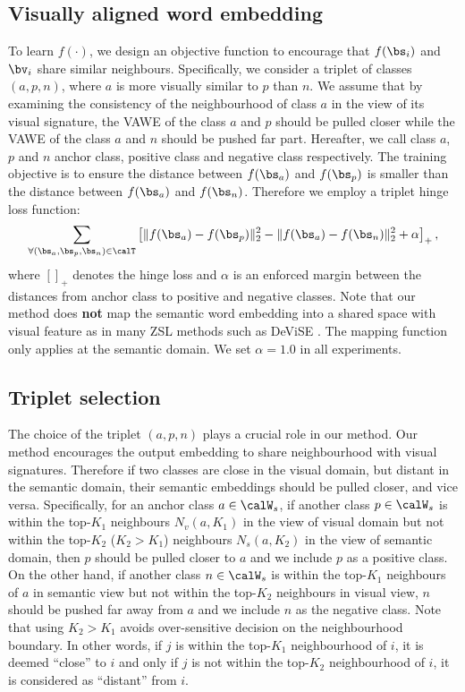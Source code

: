 \documentclass{bmvc2k}
\begin{document}
\subsection{Visually aligned word embedding}
\label{sec: structure}
To learn $f(\cdot)$, we design an objective function to encourage that $f(\bs_i)$ and $\bv_i$ share similar neighbours. Specifically, we consider a triplet of classes $(a, p, n)$, where $a$ is more visually similar to $p$ than $n$. We assume that by examining the consistency of the neighbourhood of class $a$ in the view of its visual signature, the VAWE of the class $a$ and $p$ should be pulled closer while the VAWE of the class $a$ and $n$ should be pushed far part. Hereafter, we call class $a$, $p$ and $n$ anchor class, positive class and negative class respectively. The training objective is to ensure the distance between $f(\bs_a)$ and $f(\bs_p)$ is smaller than the distance between $f(\bs_a)$ and $f(\bs_n)$. Therefore we employ a triplet hinge loss function:
\begin{align}\label{eq:LOSS}
 \sum_{\forall (\bs_a, \bs_p, \bs_n) \in \calT} \left[  \|f(\bs_a) - f(\bs_p) \|_2^2 - \|f(\bs_a) - f(\bs_n) \|_2^2  + \alpha \right]_+,
\end{align}where $[]_+$ denotes the hinge loss and $\alpha$ is an enforced margin between the distances from anchor class to positive and negative classes. Note that our method does {\bf not} map the semantic word embedding into a shared space with %
visual feature as in many ZSL methods such as DeViSE \cite{Frome2013NIPS_devise}. The mapping function only applies at the semantic domain. We set $\alpha=1.0$ in all experiments.

\subsection{Triplet selection}
\label{sec: triplet}
The choice of the triplet $(a, p, n)$ plays a crucial role in our method. Our method encourages the output embedding to share neighbourhood with visual signatures. Therefore if two classes are close in the visual domain, but distant in the semantic domain, their semantic embeddings should be pulled closer, and vice versa. Specifically, for an anchor class $a \in \calW_s$, if another class $p \in \calW_s$ is within the top-$K_1$ neighbours $N_v(a, K_1)$ in the view of visual domain but not within the top-$K_2$ ($K_2 > K_1$) neighbours $N_s(a, K_2)$ in the view of semantic domain, then $p$ should be pulled closer to $a$ and we include $p$ as a positive class. On the other hand, if another class $n \in \calW_s$ is within the top-$K_1$ neighbours of $a$ in semantic view but not within the top-$K_2$ neighbours in visual view, $n$ should be pushed far away from $a$ and we include $n$ as the negative class. Note that using $K_2 > K_1$ avoids over-sensitive decision on the neighbourhood boundary. In other words, if $j$ is within the top-$K_1$ neighbourhood of $i$, it is deemed ``close'' to $i$ and only if $j$ is not within the top-$K_2$ neighbourhood of $i$, it is considered as ``distant'' from $i$.
\end{document}
